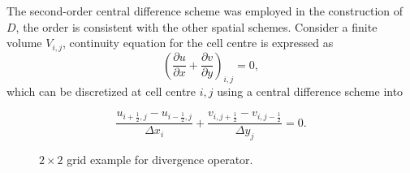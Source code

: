 \documentclass{article}
\begin{document}
The second-order central difference scheme was employed in the construction of $D$, the order is consistent with the other spatial schemes. Consider a finite volume $V_{i,j}$, continuity equation for the cell centre is expressed as
\begin{equation}
	\left(\frac{\partial u}{\partial x} + \frac{\partial v}{\partial y}\right)_{i,j}=0,
\end{equation}
which can be discretized at cell centre $i,j$ using a central difference scheme into

\begin{equation}
  \frac{u_{i+\frac{1}{2},j} - u_{i-\frac{1}{2},j}}{\Delta x_i}+  \frac{v_{i,j+\frac{1}{2}} - v_{i,j-\frac{1}{2}}}{\Delta y_j}=0.
\end{equation}


\begin{figure}[H] %
  \caption{$2\times 2$ grid example for divergence operator.}\label{fig:D-example-2x2}
\end{figure}
\end{document}
